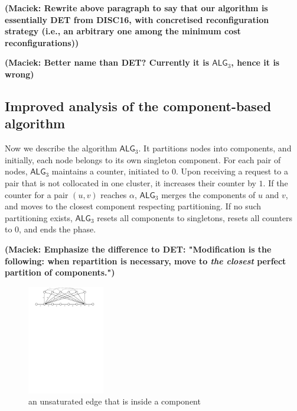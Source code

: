 \documentclass[manuscript,screen=true, review, anonymous]{acmart}
\newcommand{\TAlg}{{\ensuremath{\textsf{ALG}_{3}}}\xspace}
\newcommand\maciek[1]{\color{brown}\textbf{(Maciek: #1)}\color{black}}
\begin{document}
\maciek{Rewrite above paragraph to say that our algorithm is essentially DET from DISC16, with concretised reconfiguration strategy (i.e., an arbitrary one among the minimum cost reconfigurations)}

\maciek{Better name than DET? Currently it is \TAlg, hence it is wrong}

\subsection{Improved analysis of the component-based algorithm}
\label{sec:k3}


Now we describe the algorithm \TAlg.
It partitions nodes into components, and
initially, each node belongs to its own singleton component.
For each pair of nodes, \TAlg maintains a counter, initiated to $0$. 
Upon receiving a request to a pair that is not collocated in one cluster, it increases their counter by $1$.
If the counter for a pair $(u,v)$ reaches $\alpha$, \TAlg merges the components of $u$ and $v$, and moves to the closest component respecting partitioning.
If no such partitioning exists, \TAlg resets all components to singletons, resets all counters to $0$, and ends the phase.

\maciek{Emphasize the difference to DET: "Modification is the following: when repartition is necessary, move to \emph{the closest} perfect partition of components."}




\begin{figure}[H]
	\centering
	\includegraphics[width=0.3\textwidth]{figs/substitute}
	\caption{an unsaturated edge that is inside a component}
\end{figure}
\end{document}
